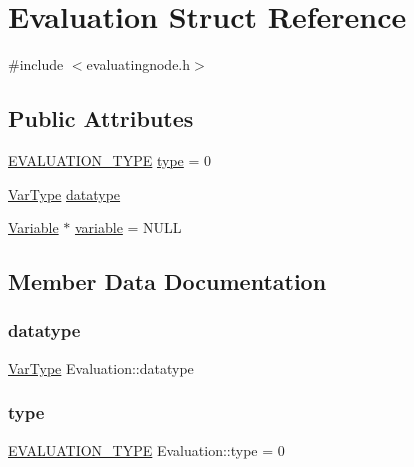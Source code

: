 \hypertarget{structEvaluation}{}\section{Evaluation Struct Reference}
\label{structEvaluation}


{\ttfamily \#include $<$evaluatingnode.\+h$>$}

\subsection*{Public Attributes}
\begin{DoxyCompactItemize}
\item 
\hyperlink{statics_8h_a6664c451ca7787483a7981cc1de68dbb}{E\+V\+A\+L\+U\+A\+T\+I\+O\+N\+\_\+\+T\+Y\+PE} \hyperlink{structEvaluation_ab056e930fde1d7f4ce8474e31f133860}{type} = 0
\item 
\hyperlink{classVarType}{Var\+Type} \hyperlink{structEvaluation_abd759f3afe3d74d94f38e340f77be416}{datatype}
\item 
\hyperlink{classVariable}{Variable} $\ast$ \hyperlink{structEvaluation_a96871a714d91ba54beaf1526d9185ca0}{variable} = N\+U\+LL
\end{DoxyCompactItemize}


\subsection{Member Data Documentation}
\mbox{\label{structEvaluation_abd759f3afe3d74d94f38e340f77be416}} 
\subsubsection{\texorpdfstring{datatype}{datatype}}
{\footnotesize\ttfamily \hyperlink{classVarType}{Var\+Type} Evaluation\+::datatype}

\mbox{\label{structEvaluation_ab056e930fde1d7f4ce8474e31f133860}} 
\subsubsection{\texorpdfstring{type}{type}}
{\footnotesize\ttfamily \hyperlink{statics_8h_a6664c451ca7787483a7981cc1de68dbb}{E\+V\+A\+L\+U\+A\+T\+I\+O\+N\+\_\+\+T\+Y\+PE} Evaluation\+::type = 0}


